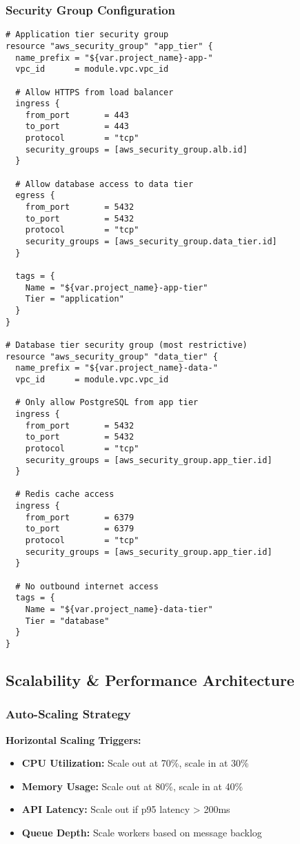 \subsubsection{Security Group Configuration}

\begin{verbatim}
# Application tier security group
resource "aws_security_group" "app_tier" {
  name_prefix = "${var.project_name}-app-"
  vpc_id      = module.vpc.vpc_id

  # Allow HTTPS from load balancer
  ingress {
    from_port       = 443
    to_port         = 443
    protocol        = "tcp"
    security_groups = [aws_security_group.alb.id]
  }

  # Allow database access to data tier
  egress {
    from_port       = 5432
    to_port         = 5432
    protocol        = "tcp"
    security_groups = [aws_security_group.data_tier.id]
  }

  tags = {
    Name = "${var.project_name}-app-tier"
    Tier = "application"
  }
}

# Database tier security group (most restrictive)
resource "aws_security_group" "data_tier" {
  name_prefix = "${var.project_name}-data-"
  vpc_id      = module.vpc.vpc_id

  # Only allow PostgreSQL from app tier
  ingress {
    from_port       = 5432
    to_port         = 5432
    protocol        = "tcp"
    security_groups = [aws_security_group.app_tier.id]
  }

  # Redis cache access
  ingress {
    from_port       = 6379
    to_port         = 6379
    protocol        = "tcp"
    security_groups = [aws_security_group.app_tier.id]
  }

  # No outbound internet access
  tags = {
    Name = "${var.project_name}-data-tier"
    Tier = "database"
  }
}
\end{verbatim}

\subsection{Scalability \& Performance Architecture}

\subsubsection{Auto-Scaling Strategy}

\textbf{Horizontal Scaling Triggers:}
\begin{itemize}
  \item \textbf{CPU Utilization:} Scale out at 70\%, scale in at 30\%
  \item \textbf{Memory Usage:} Scale out at 80\%, scale in at 40\%
  \item \textbf{API Latency:} Scale out if p95 latency > 200ms
  \item \textbf{Queue Depth:} Scale workers based on message backlog
\end{itemize}

